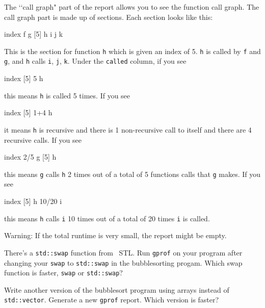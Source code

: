 The \lq\lq call graph" part of the report allows you to see the function
call graph.
The call graph part is made up of sections.
Each section looks like this:
\begin{console}[fontsize=\footnotesize]
index %
                                            f
                                            g
[5]                                     h   
                                            i
                                            j
                                            k
\end{console}
This is the section for function \verb!h! which is given an index of 5.
\verb!h! is called by \verb!f! and \verb!g!, and
\verb!h! calls \verb!i!, \verb!j!, \verb!k!.
Under the \verb!called! column, if you see
\begin{console}[fontsize=\footnotesize]
index %
[5]                           5         h   
\end{console}
this means \verb!h! is called 5 times.
If you see
\begin{console}[fontsize=\footnotesize]
index %
[5]                           1+4       h   
\end{console}
it means \verb!h! is recursive and there is 1 non-recursive call to
itself and there are 4 recursive calls.
If you see
\begin{console}[fontsize=\footnotesize]
index %
                              2/5           g  
[5]                                     h   
\end{console}
this means \verb!g! calls \verb!h! 2 times out of a total of 5 functions calls
that \verb!g! makes.
If you see
\begin{console}[fontsize=\footnotesize]
index %
[5]                                     h   
                              10/20         i
\end{console}
this means \verb!h! calls \verb!i! 10 times out of a total of 20 times
\verb!i! is called.

Warning: If the total runtime is very small, the report might be empty.


\begin{ex}
  \mbox{}
  \begin{myenum}
  \item
    There's a \verb!std::swap! function from \cpp\ STL.
    Run \verb!gprof! on your program after changing your \verb!swap! to
    \verb!std::swap! in the bubblesorting progam.
    Which swap function is faster, \verb!swap! or \verb!std::swap!?
  \item
    Write another version of the bubblesort program using
    arrays instead of \verb!std::vector!.
    Generate a new \verb!gprof! report.
    Which version is faster?
  \end{myenum}
\end{ex}
 

